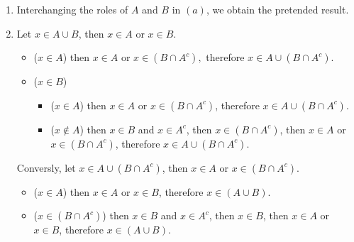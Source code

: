 \documentclass{article}
\begin{document}
\begin{enumerate}[label=(\alph*)]
    Conversly, let $x \in (B \cap A) \cup (B \cap A^c),$ then $x \in (B \cap A)$ or $x \in (B \cap A^c)$.
    \begin{itemize}
        \item $(x \in (B \cap A))$ then $x \in B$ and $x \in A$, therefore $x \in B$.
        \item ($x \in (B \cap A^c))$, then $x \in B$ and $x \in A^c$, therefore $x \in B$.
    \end{itemize}

    \vspace{0.5cm}

    \item Interchanging the roles of $A$ and $B$ in $(a)$, we obtain the pretended result.

    \vspace{0.5cm}

    \item Let $x \in A \cup B$, then $x \in A$ or $x \in B$.
    \begin{itemize}
        \item ($x \in A$) then $x \in A$ or $x \in (B \cap A^c),$ therefore $x \in A \cup(B \cap A^c)$.
        \item ($x \in B$)
        \begin{itemize}
            \item ($x \in A$) then $x \in A$ or $x \in (B \cap A^c)$, therefore $x \in A \cup (B \cap A^c)$.
            \item ($x \notin A$) then $x \in B$ and $x \in A^c$, then $x \in (B \cap A^c)$, then $x \in A$ or $x \in (B \cap A^c)$, therefore $x \in A \cup (B \cap A^c)$.
        \end{itemize}
    \end{itemize}

    Conversly, let $x \in A \cup (B \cap A^c)$, then $x \in A$ or $x \in (B \cap A^c)$.
    \begin{itemize}
        \item ($x \in A$) then $x \in A$ or $x \in B$, therefore $x \in (A \cup B)$.
        \item ($x \in (B \cap A^c)$) then $x \in B$ and $x \in A^c$, then $x \in B$, then $x \in A$ or $x \in B$, therefore $x \in (A \cup B)$.
    \end{itemize}
\end{enumerate}
\end{document}
